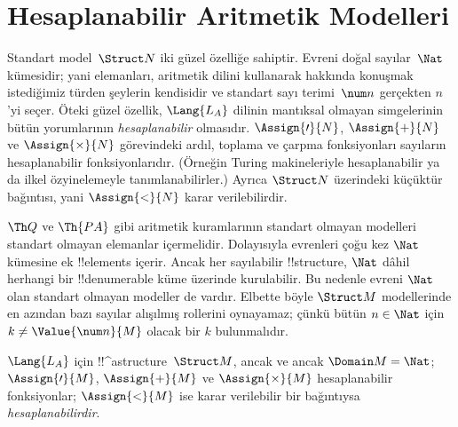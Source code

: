 

\section{Hesaplanabilir Aritmetik Modelleri}

\begin{explain}
Standart model~$\Struct N$ iki güzel özelliğe sahiptir. Evreni doğal
sayılar~$\Nat$ kümesidir; yani elemanları, aritmetik dilini kullanarak
hakkında konuşmak istediğimiz türden şeylerin kendisidir ve standart
sayı terimi~$\num n$ gerçekten $n$'yi seçer. Öteki güzel özellik,
$\Lang{L_A}$ dilinin mantıksal olmayan simgelerinin bütün yorumlarının
\emph{hesaplanabilir} olmasıdır. $\Assign{\prime}{N}$,
$\Assign{+}{N}$ ve $\Assign{\times}{N}$ görevindeki ardıl, toplama ve
çarpma fonksiyonları sayıların hesaplanabilir fonksiyonlarıdır. (Örneğin
Turing makineleriyle hesaplanabilir ya da ilkel özyinelemeyle
tanımlanabilirler.) Ayrıca $\Struct N$ üzerindeki küçüktür bağıntısı,
yani $\Assign{<}{N}$ karar verilebilirdir.

$\Th Q$ ve $\Th{PA}$ gibi aritmetik kuramlarının standart olmayan
modelleri standart olmayan elemanlar içermelidir. Dolayısıyla evrenleri
çoğu kez $\Nat$ kümesine ek !!{element}s içerir. Ancak her sayılabilir
!!{structure}, $\Nat$ dâhil herhangi bir !!{denumerable} küme üzerinde
kurulabilir. Bu nedenle evreni $\Nat$ olan standart olmayan modeller de
vardır. Elbette böyle $\Struct M$ modellerinde en azından bazı sayılar
alışılmış rollerini oynayamaz; çünkü bütün $n\in\Nat$ için
$k\neq\Value{\num n}{M}$ olacak bir $k$ bulunmalıdır.
\end{explain}

\begin{defn}
$\Lang{L_A}$ için !!^a{structure}~$\Struct M$, ancak ve ancak
$\Domain M=\Nat$; $\Assign{\prime}{M}$, $\Assign{+}{M}$ ve
$\Assign{\times}{M}$ hesaplanabilir fonksiyonlar; $\Assign{<}{M}$ ise
karar verilebilir bir bağıntıysa \emph{hesaplanabilirdir}.
\end{defn}

